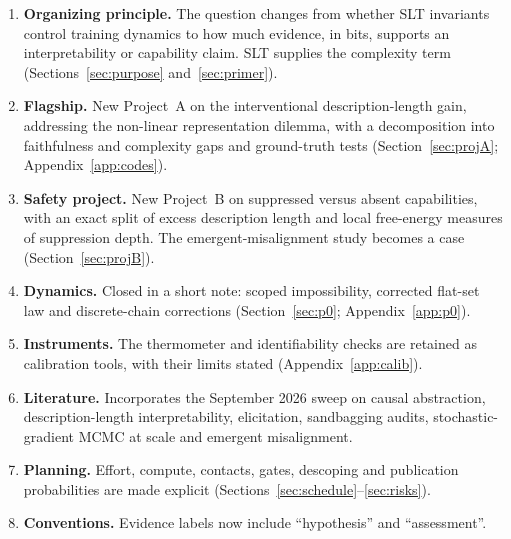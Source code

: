 \documentclass[11pt,a4paper]{article}
\begin{document}
\begin{enumerate}[leftmargin=*]
\item \textbf{Organizing principle.} The question changes from whether SLT
invariants control training dynamics to how much evidence, in bits,
supports an interpretability or capability claim. SLT supplies the
complexity term (Sections~\ref{sec:purpose} and~\ref{sec:primer}).
\item \textbf{Flagship.} New Project~A on the interventional
description-length gain, addressing the non-linear representation
dilemma, with a decomposition into faithfulness and complexity gaps and
ground-truth tests (Section~\ref{sec:projA}; Appendix~\ref{app:codes}).
\item \textbf{Safety project.} New Project~B on suppressed versus absent
capabilities, with an exact split of excess description length and local
free-energy measures of suppression depth. The emergent-misalignment
study becomes a case (Section~\ref{sec:projB}).
\item \textbf{Dynamics.} Closed in a short note: scoped impossibility,
corrected flat-set law and discrete-chain corrections
(Section~\ref{sec:p0}; Appendix~\ref{app:p0}).
\item \textbf{Instruments.} The thermometer and identifiability checks
are retained as calibration tools, with their limits stated
(Appendix~\ref{app:calib}).
\item \textbf{Literature.} Incorporates the September 2026 sweep on
causal abstraction, description-length interpretability, elicitation,
sandbagging audits, stochastic-gradient MCMC at scale and emergent
misalignment.
\item \textbf{Planning.} Effort, compute, contacts, gates, descoping and
publication probabilities are made explicit
(Sections~\ref{sec:schedule}--\ref{sec:risks}).
\item \textbf{Conventions.} Evidence labels now include ``hypothesis'' and
``assessment''.
\end{enumerate}
\end{document}
